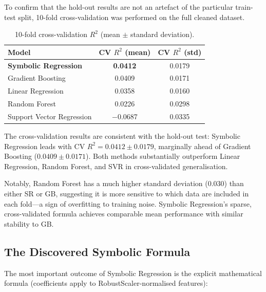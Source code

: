 \documentclass[12pt,a4paper]{article}
\begin{document}
To confirm that the hold-out results are not an artefact of the particular
train-test split, 10-fold cross-validation was performed on the full cleaned
dataset.

\begin{table}[H]
  \centering
  \caption{10-fold cross-validation $R^{2}$ (mean $\pm$ standard deviation).}
  \label{tab:cv}
  \begin{tabular}{lcc}
    \toprule
    \textbf{Model} & \textbf{CV $R^{2}$ (mean)} & \textbf{CV $R^{2}$ (std)} \\
    \midrule
    \textbf{Symbolic Regression} & \textbf{0.0412} & 0.0179 \\
    Gradient Boosting            & 0.0409           & 0.0171 \\
    Linear Regression            & 0.0358           & 0.0160 \\
    Random Forest                & 0.0226           & 0.0298 \\
    Support Vector Regression    & $-$0.0687        & 0.0335 \\
    \bottomrule
  \end{tabular}
\end{table}

The cross-validation results are consistent with the hold-out test: Symbolic
Regression leads with CV $R^{2} = 0.0412 \pm 0.0179$, marginally ahead of
Gradient Boosting ($0.0409 \pm 0.0171$). Both methods substantially outperform
Linear Regression, Random Forest, and SVR in cross-validated generalisation.

Notably, Random Forest has a much higher standard deviation (0.030) than either
SR or GB, suggesting it is more sensitive to which data are included in each
fold---a sign of overfitting to training noise. Symbolic Regression's sparse,
cross-validated formula achieves comparable mean performance with similar
stability to GB.

\subsection{The Discovered Symbolic Formula}
\label{subsec:formula}

The most important outcome of Symbolic Regression is the explicit mathematical
formula (coefficients apply to RobustScaler-normalised features):
\end{document}
